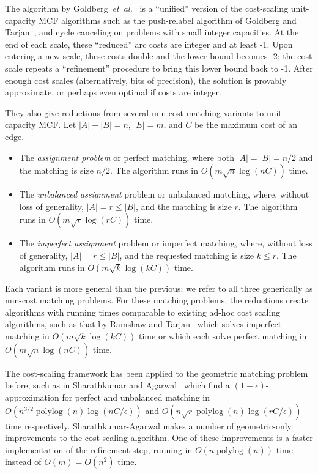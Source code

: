 \documentclass[11pt]{article}
\def\etal{\textsl{et~al.}}
\def\polylog{\mathop{\mathrm{polylog}}}
\theoremstyle{plain}
\begin{document}
The algorithm by Goldberg~{\etal}~\cite{DBLP:journals/mst/GoldbergHKT17} is a ``unified'' version
of the cost-scaling unit-capacity MCF algorithms such as the push-relabel algorithm of 
Goldberg and Tarjan~\cite{DBLP:journals/mor/GoldbergT90}, 
and cycle canceling on problems with small integer capacities. 
At the end of each scale, these ``reduced'' arc costs are integer and at least -1.
Upon entering a new scale, these costs double and the lower bound becomes -2; 
the cost scale repeats a ``refinement'' procedure to bring this lower bound back to -1.
After enough cost scales (alternatively, bits of precision), 
the solution is provably approximate, or perhaps even optimal if costs are integer.

They also give reductions from several min-cost matching variants to unit-capacity MCF.
Let $|A| + |B| = n$, $|E| = m$, and $C$ be the maximum cost of an edge.
\begin{itemize}
	\item The \emph{assignment problem} or perfect matching, 
		where both $|A| = |B| = n/2$ and the matching is size $n/2$.
		The algorithm runs in $O(m\sqrt{n}\log(nC))$ time.
	\item The \emph{unbalanced assignment} problem or unbalanced matching, 
		where, without loss of generality, $|A| = r \leq |B|$,
		and the matching is size $r$.
		The algorithm runs in $O(m\sqrt{r}\log(rC))$ time.
	\item The \emph{imperfect assignment} problem or imperfect matching, 
		where, without loss of generality, $|A| = r \leq |B|$,
		and the requested matching is size $k \leq r$.
		The algorithm runs in $O(m\sqrt{k}\log(kC))$ time.
\end{itemize}
Each variant is more general than the previous; 
we refer to all three generically as min-cost matching problems.
For these matching problems, the reductions create algorithms with 
running times comparable to existing ad-hoc cost scaling algorithms, 
such as that by Ramshaw and Tarjan~\cite{DBLP:conf/focs/RamshawT12} which solves 
imperfect matching in $O(m\sqrt{k}\log(kC))$ time
or \cite{DBLP:journals/siamcomp/GabowT89, DBLP:journals/mp/OrlinA92, DBLP:journals/siamdm/GoldbergK97} 
which each solve perfect matching in $O(m\sqrt{n}\log(nC))$ time.

The cost-scaling framework has been applied to the geometric matching problem before,
such as in Sharathkumar and Agarwal~\cite{DBLP:conf/soda/SharathkumarA12}
which find a $(1+\epsilon)$-approximation for perfect and unbalanced matching in 
$O(n^{3/2}\polylog(n)\log(nC/\epsilon))$ and $O(n\sqrt{r}\polylog(n)\log(rC/\epsilon))$
time respectively.
Sharathkumar-Agarwal makes a number of geometric-only improvements to the cost-scaling algorithm.
One of these improvements is a faster implementation of the refinement step, 
running in $O(n\polylog(n))$ time instead of $O(m) = O(n^2)$ time.
\end{document}
